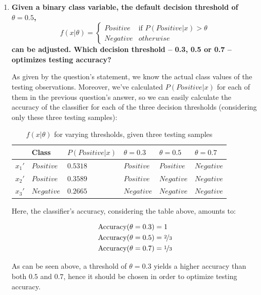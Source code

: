 \documentclass[12pt]{article}
\begin{document}
\begin{enumerate}[leftmargin=\labelsep]
        \pagebreak

  \item \textbf{Given a binary class variable, the default decision threshold of $\theta = 0.5$,
          $$
            f(x | \theta) = \begin{cases}
              Positive & \text{if } P(Positive | x) > \theta \\
              Negative & otherwise
            \end{cases}
          $$
          can be adjusted. Which decision threshold – 0.3, 0.5 or 0.7 – optimizes testing accuracy?
        }

        As given by the question's statement, we know the actual class values of the testing observations.
        Moreover, we've calculated $P(Positive | x)$ for each of them in the previous question's answer,
        so we can easily calculate the accuracy of the classifier for each of the three decision thresholds
        (considering only these three testing samples):

        \begin{table}[h]
          \centering
          \begin{tabular}{l|l|l|l|l|l}
            \hline
                   & Class      & $P(Positive | x)$ & $\theta = 0.3$ & $\theta = 0.5$ & $\theta = 0.7$ \\ \hline
            $x_1'$ & $Positive$ & $0.5318$          & $Positive$     & $Positive$     & $Negative$     \\ \hline
            $x_2'$ & $Positive$ & $0.3589$          & $Positive$     & $Negative$     & $Negative$     \\ \hline
            $x_3'$ & $Negative$ & $0.2665$          & $Negative$     & $Negative$     & $Negative$     \\ \hline
          \end{tabular}
          \caption{$f(x | \theta)$ for varying thresholds, given three testing samples}
          \label{tab:thresholds}
        \end{table}

        Here, the classifier's accuracy, considering the table above, amounts to:

        \begin{align*}
          \text{Accuracy}(\theta = 0.3) & = 1               \\
          \text{Accuracy}(\theta = 0.5) & = \nicefrac{2}{3} \\
          \text{Accuracy}(\theta = 0.7) & = \nicefrac{1}{3}
        \end{align*}

        As can be seen above, a threshold of $\theta = 0.3$ yields a higher accuracy than
        both $0.5$ and $0.7$, hence it should be chosen in order to optimize testing accuracy.

\end{enumerate}
\end{document}
